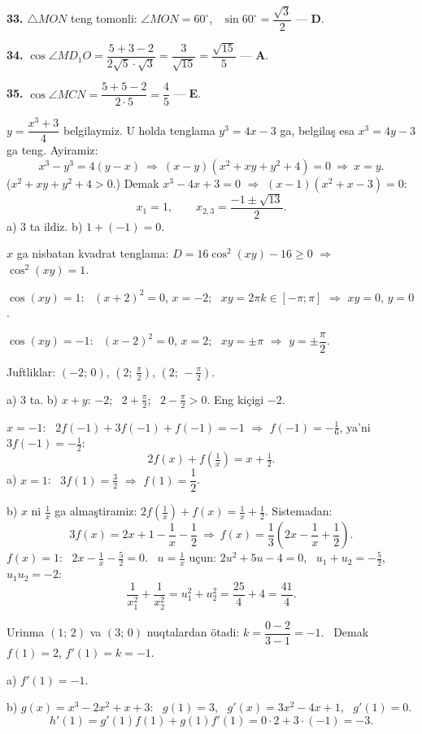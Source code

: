 \textbf{33.} $\triangle MON$ teng tomonli: $\angle MON=60^\circ$, \ $\sin60^\circ=\dfrac{\sqrt3}2$ — \textbf{D}.

\textbf{34.} $\cos\angle MD_1O=\dfrac{5+3-2}{2\sqrt5\cdot\sqrt3}=\dfrac3{\sqrt{15}}=\dfrac{\sqrt{15}}5$ — \textbf{A}.

\textbf{35.} $\cos\angle MCN=\dfrac{5+5-2}{2\cdot5}=\dfrac45$ — \textbf{E}.

\newpage
{}
$y=\dfrac{x^3+3}4$ belgilaymiz. U holda tenglama $y^3=4x-3$ ga, belgilaş esa $x^3=4y-3$ ga teng. Ayiramiz:
\[x^3-y^3=4(y-x)\ \Rightarrow\ (x-y)\left(x^2+xy+y^2+4\right)=0\ \Rightarrow\ x=y.\]
($x^2+xy+y^2+4>0$.) Demak $x^3-4x+3=0$ $\Rightarrow$ $(x-1)\left(x^2+x-3\right)=0$:
\[x_1=1,\qquad x_{2,3}=\frac{-1\pm\sqrt{13}}2.\]
a) $3$ ta ildiz. \quad b) $1+(-1)=0$.

\newpage
{}
$x$ ga nisbatan kvadrat tenglama: $D=16\cos^2(xy)-16\ge0$ $\Rightarrow$ $\cos^2(xy)=1$.

$\cos(xy)=1$: \ $(x+2)^2=0$, $x=-2$; \ $xy=2\pi k\in[-\pi;\pi]$ $\Rightarrow$ $xy=0$, $y=0$.

$\cos(xy)=-1$: \ $(x-2)^2=0$, $x=2$; \ $xy=\pm\pi$ $\Rightarrow$ $y=\pm\dfrac\pi2$.

Juftliklar: $(-2;\,0)$, $\left(2;\,\frac\pi2\right)$, $\left(2;\,-\frac\pi2\right)$.

a) $3$ ta. \quad b) $x+y$: $-2$; \ $2+\frac\pi2$; \ $2-\frac\pi2>0$. Eng kiçigi $-2$.

\newpage
{}
$x=-1$: \ $2f(-1)+3f(-1)+f(-1)=-1$ $\Rightarrow$ $f(-1)=-\frac16$, ya'ni $3f(-1)=-\frac12$:
\[2f(x)+f\left(\tfrac1x\right)=x+\tfrac12.\]
a) $x=1$: \ $3f(1)=\frac32$ $\Rightarrow$ $f(1)=\dfrac12$.

b) $x$ ni $\frac1x$ ga almaştiramiz: $2f\left(\frac1x\right)+f(x)=\frac1x+\frac12$. Sistemadan:
\[3f(x)=2x+1-\frac1x-\frac12\ \Rightarrow\ f(x)=\frac13\left(2x-\frac1x+\frac12\right).\]
$f(x)=1$: \ $2x-\frac1x-\frac52=0$. \ $u=\frac1x$ uçun: $2u^2+5u-4=0$, \ $u_1+u_2=-\frac52$, \ $u_1u_2=-2$:
\[\frac1{x_1^2}+\frac1{x_2^2}=u_1^2+u_2^2=\frac{25}4+4=\frac{41}4.\]

\newpage
{}
Urinma $(1;\,2)$ va $(3;\,0)$ nuqtalardan ötadi: $k=\dfrac{0-2}{3-1}=-1$. \ Demak $f(1)=2$, $f'(1)=k=-1$.

a) $f'(1)=-1$.

b) $g(x)=x^3-2x^2+x+3$: \ $g(1)=3$, \ $g'(x)=3x^2-4x+1$, \ $g'(1)=0$.
\[h'(1)=g'(1)f(1)+g(1)f'(1)=0\cdot2+3\cdot(-1)=-3.\]

